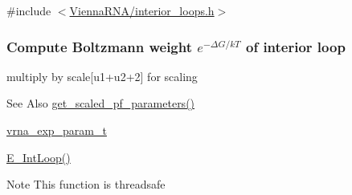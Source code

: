 {\ttfamily \#include $<$\hyperlink{interior__loops_8h}{Vienna\-R\-N\-A/interior\-\_\-loops.\-h}$>$}

\subsubsection*{Compute Boltzmann weight $e^{-\Delta G/kT} $ of interior loop}

multiply by scale\mbox{[}u1+u2+2\mbox{]} for scaling \begin{DoxySeeAlso}{See Also}
\hyperlink{group__energy__parameters_gabf3b9271c41dd3fac02d56e0b02b3344}{get\-\_\-scaled\-\_\-pf\-\_\-parameters()} 

\hyperlink{group__energy__parameters_ga01d8b92fe734df8d79a6169482c7d8d8}{vrna\-\_\-exp\-\_\-param\-\_\-t} 

\hyperlink{group__loops_ga0266d2c7a6098259280fb97e9f980b34}{E\-\_\-\-Int\-Loop()} 
\end{DoxySeeAlso}
\begin{DoxyNote}{Note}
This function is threadsafe
\end{DoxyNote}

